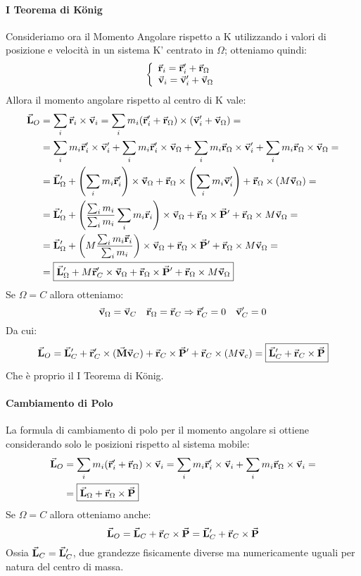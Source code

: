 \documentclass{article}
\newcommand{\then}{\ensuremath{\Rightarrow}}
\renewcommand{\v}{\va{v}}
\renewcommand{\r}{\va{r}}
\newcommand{\M}{\va{M}}
\renewcommand{\P}{\va{P}}
\renewcommand{\L}{\va{L}}
\begin{document}
\paragraph{I Teorema di König}
Consideriamo ora il Momento Angolare rispetto a K utilizzando i valori di posizione e velocità in un sistema K' centrato in $\Omega$; otteniamo quindi:
\[\left\{\begin{array}{l}
    \r_i=\r_i'+\r_{\Omega}   \\
     \v_i=\v_i'+\v_{\Omega}
\end{array}\right.\]
Allora il momento angolare rispetto al centro di K vale:
\begin{equation}
\begin{split}
    \L_O&=\sum_i\r_i\times\v_i=\sum_im_i(\r_i'+\r_{\Omega})\times(\v_i'+\v_{\Omega})=\\
    &=\sum_im_i\r_i'\times\v_i'+\sum_im_i\r_i'\times\v_{\Omega}+\sum_im_i\r_{\Omega}\times\v_i'+\sum_im_i\r_{\Omega}\times\v_{\Omega}=\\
    &=\L_{\Omega}'+\left(\sum_im_i\r_i'\right)\times\v_{\Omega}+\r_{\Omega}\times\left(\sum_im_i\v_i'\right)+\r_{\Omega}\times(M\v_{\Omega})=\\
    &=\L_{\Omega}'+\left(\frac{\sum_im_i}{\sum_im_i}\sum_im_i\r_i\right)\times\v_{\Omega}+\r_\Omega\times\P'+\r_{\Omega}\times M\v_{\Omega}=\\
    &=\L_{\Omega}'+\left(M\frac{\sum_im_i\r_i}{\sum_im_i}\right)\times\v_{\Omega}+\r_\Omega\times\P'+\r_{\Omega}\times M\v_{\Omega}=\\
    &=\boxed{\L_{\Omega}'+M\r_C'\times\v_{\Omega}+\r_{\Omega}\times\P'+\r_{\Omega}\times M\v_{\Omega}}
\end{split}
\end{equation}
Se $\Omega=C$ allora otteniamo:
\[\v_{\Omega}=\v_C\quad\r_{\Omega}=\r_C\then \r_C'=0\quad\v_C'=0\]
Da cui:
\begin{equation}
    \L_O=\L_C'+\r_C'\times(\M\v_C)+\r_C\times\P'+\r_C\times(M\v_c)=\boxed{\L_C'+\r_C\times\P}
\end{equation}
Che è proprio il I Teorema di König.
\paragraph{Cambiamento di Polo}
La formula di cambiamento di polo per il momento angolare si ottiene considerando solo le posizioni rispetto al sistema mobile:
\begin{equation}
\begin{split}
    \L_O&=\sum_im_i(\r_i'+\r_{\Omega})\times\v_i=\sum_im_i\r_i'\times\v_i+\sum_im_i\r_{\Omega}\times\v_i=\\
    &=\boxed{\L_{\Omega}+\r_{\Omega}\times\P}
\end{split}
\end{equation}
Se $\Omega=C$ allora otteniamo anche:
\[\L_O=\L_C+\r_C\times\P=\L_C'+\r_C\times\P\]
Ossia $\L_C=\L_C'$, due grandezze fisicamente diverse ma numericamente uguali per natura del centro di massa.
\end{document}
